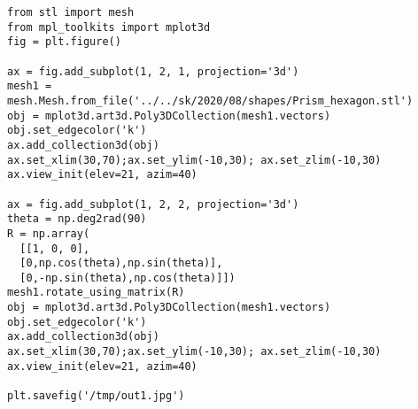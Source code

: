 \documentclass[12pt,fleqn]{article}\usepackage{../../common}
\begin{document}
\begin{verbatim}
from stl import mesh
from mpl_toolkits import mplot3d
fig = plt.figure()

ax = fig.add_subplot(1, 2, 1, projection='3d')
mesh1 = mesh.Mesh.from_file('../../sk/2020/08/shapes/Prism_hexagon.stl')
obj = mplot3d.art3d.Poly3DCollection(mesh1.vectors)
obj.set_edgecolor('k')
ax.add_collection3d(obj)
ax.set_xlim(30,70);ax.set_ylim(-10,30); ax.set_zlim(-10,30)
ax.view_init(elev=21, azim=40)

ax = fig.add_subplot(1, 2, 2, projection='3d')
theta = np.deg2rad(90)
R = np.array(
  [[1, 0, 0],
  [0,np.cos(theta),np.sin(theta)],
  [0,-np.sin(theta),np.cos(theta)]])
mesh1.rotate_using_matrix(R)
obj = mplot3d.art3d.Poly3DCollection(mesh1.vectors)
obj.set_edgecolor('k')
ax.add_collection3d(obj)
ax.set_xlim(30,70);ax.set_ylim(-10,30); ax.set_zlim(-10,30)
ax.view_init(elev=21, azim=40)

plt.savefig('/tmp/out1.jpg')
\end{verbatim}
\end{document}
